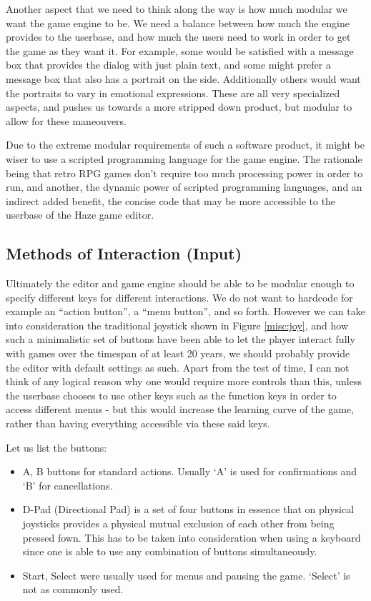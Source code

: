 Another aspect that we need to think along the way is how much modular we want
the game engine to be. We need a balance between how much the engine provides
to the userbase, and how much the users need to work in order to get the game
as they want it. For example, some would be satisfied with a message box that
provides the dialog with just plain text, and some might prefer a message box
that also has a portrait on the side. Additionally others would want the
portraits to vary in emotional expressions. These are all very specialized
aspects, and pushes us towards a more stripped down product, but modular to
allow for these maneouvers.

Due to the extreme modular requirements of such a software product, it might be
wiser to use a scripted programming language for the game engine. The rationale
being that retro RPG games don't require too much processing power in order to
run, and another, the dynamic power of scripted programming languages, and an
indirect added benefit, the concise code that may be more accessible to the
userbase of the Haze game editor.

\subsection{Methods of Interaction (Input)}

Ultimately the editor and game engine should be able to be modular enough to
specify different keys for different interactions. We do not want to hardcode
for example an ``action button'', a ``menu button'', and so forth. However we
can take into consideration the traditional joystick shown in Figure
\ref{misc:joy}, and how such a minimalistic set of buttons have been able to
let the player interact fully with games over the timespan of at least 20 years,
we should probably provide the editor with default settings as such. Apart from
the test of time, I can not think of any logical reason why one would require
more controls than this, unless the userbase chooses to use other keys such as
the function keys in order to access different menus - but this would increase
the learning curve of the game, rather than having everything accessible via
these said keys.


Let us list the buttons:
\begin{itemize}
\item{A, B} buttons for standard actions. Usually `A' is used for confirmations
and `B' for cancellations.
\item{D-Pad (Directional Pad)} is a set of four buttons in essence that on
physical joysticks provides a physical mutual exclusion of each other from
being pressed fown. This has to be taken into consideration when using a
keyboard since one is able to use any combination of buttons simultaneously.
\item{Start, Select} were usually used for menus and pausing the game. `Select'
is not as commonly used.
\end{itemize}

